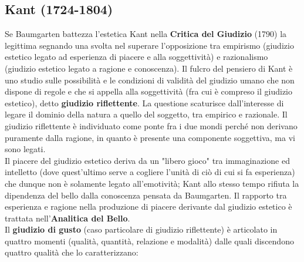 \documentclass[10pt,a4paper]{article}
\begin{document}
\subsection{Kant (1724-1804)}
Se Baumgarten battezza l'estetica Kant nella \textbf{Critica del Giudizio} (1790) la legittima segnando una svolta nel superare l'opposizione tra empirismo (giudizio estetico legato ad esperienza di piacere e alla soggettività) e razionalismo (giudizio estetico legato a ragione e conoscenza). Il fulcro del pensiero di Kant è uno studio sulle possibilità e le condizioni di validità del giudizio umano che non dispone di regole e che si appella alla soggettività (fra cui è compreso il giudizio estetico), detto \textbf{giudizio riflettente}. La questione scaturisce dall'interesse di legare il dominio della natura a quello del soggetto, tra empirico e razionale. Il giudizio riflettente è individuato come ponte fra i due mondi perché non derivano puramente dalla ragione, in quanto è presente una componente soggettiva, ma vi sono legati.\\
Il piacere del giudizio estetico deriva da un "libero gioco" tra immaginazione ed intelletto (dove quest'ultimo serve a cogliere l'unità di ciò di cui si fa esperienza) che dunque non è solamente legato all'emotività; Kant allo stesso tempo rifiuta la dipendenza del bello dalla conoscenza pensata da Baumgarten. Il rapporto tra esperienza e ragione nella produzione di piacere derivante dal giudizio estetico è trattata nell'\textbf{Analitica del Bello}.\\
Il \textbf{giudizio di gusto} (caso particolare di giudizio riflettente) è articolato in quattro momenti (qualità, quantità, relazione e modalità) dalle quali discendono quattro qualità che lo caratterizzano:
\end{document}
